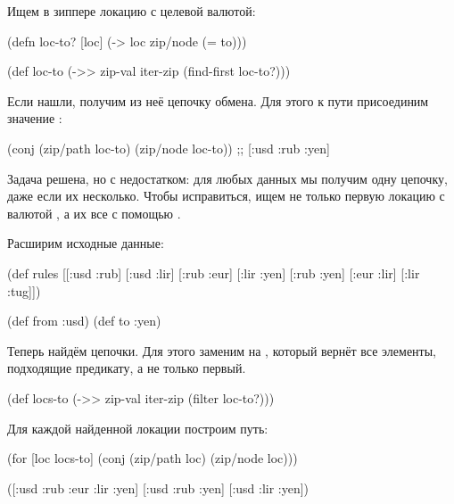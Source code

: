 Ищем в зиппере локацию с целевой валютой:

\begin{english}
  \begin{clojure}
(defn loc-to? [loc]
  (-> loc zip/node (= to)))

(def loc-to
  (->> zip-val
       iter-zip
       (find-first loc-to?)))
  \end{clojure}
\end{english}

Если нашли, получим из неё цепочку обмена. Для этого к пути присоединим значение
:

\begin{english}
  \begin{clojure}
(conj (zip/path loc-to) (zip/node loc-to))
;; [:usd :rub :yen]
  \end{clojure}
\end{english}

Задача решена, но с недостатком: для любых данных мы получим одну цепочку, даже
если их несколько. Чтобы исправиться, ищем не только первую локацию с валютой
, а их все с помощью .

Расширим исходные данные:

\begin{english}
  \begin{clojure}
(def rules
  [[:usd :rub]
   [:usd :lir]
   [:rub :eur]
   [:lir :yen]
   [:rub :yen]
   [:eur :lir]
   [:lir :tug]])

(def from :usd)
(def to :yen)
  \end{clojure}
\end{english}

Теперь найдём цепочки. Для этого заменим  на ,
который вернёт все элементы, подходящие предикату, а не только первый.

\begin{english}
  \begin{clojure}
(def locs-to
  (->> zip-val
       iter-zip
       (filter loc-to?)))
  \end{clojure}
\end{english}

Для каждой найденной локации построим путь:

\begin{english}
  \begin{clojure}
(for [loc locs-to]
  (conj (zip/path loc) (zip/node loc)))

([:usd :rub :eur :lir :yen]
 [:usd :rub :yen]
 [:usd :lir :yen])
  \end{clojure}
\end{english}

